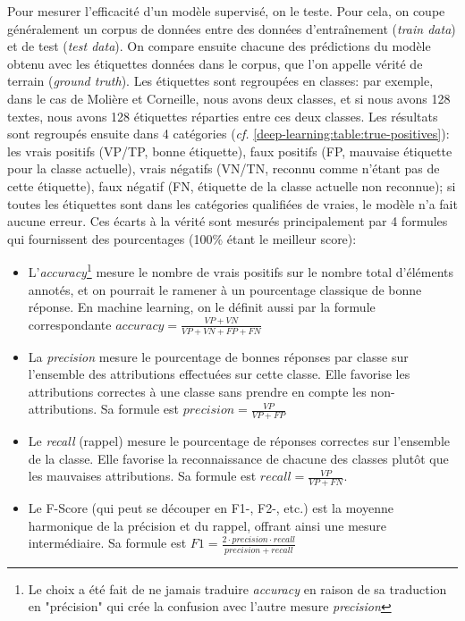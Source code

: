 Pour mesurer l'efficacité d'un modèle supervisé, on le teste. Pour cela, on coupe généralement un corpus de données entre des données d'entraînement (\textit{train data}) et de test (\textit{test data}). On compare ensuite chacune des prédictions du modèle obtenu avec les étiquettes données dans le corpus, que l'on appelle vérité de terrain (\textit{ground truth}). Les étiquettes sont regroupées en classes: par exemple, dans le cas de Molière et Corneille, nous avons deux classes, et si nous avons 128 textes, nous avons 128 étiquettes réparties entre ces deux classes. Les résultats sont regroupés ensuite dans 4 catégories (\textit{cf.} \ref{deep-learning:table:true-positives}): les vrais positifs (VP/TP, bonne étiquette), faux positifs (FP, mauvaise étiquette pour la classe actuelle), vrais négatifs (VN/TN, reconnu comme n'étant pas de cette étiquette), faux négatif (FN, étiquette de la classe actuelle non reconnue); si toutes les étiquettes sont dans les catégories qualifiées de vraies, le modèle n'a fait aucune erreur. Ces écarts à la vérité sont mesurés principalement par 4 formules qui fournissent des pourcentages (100\% étant le meilleur score):
\begin{itemize}
    \item L'\textit{accuracy}\footnote{Le choix a été fait de ne jamais traduire \textit{accuracy} en raison de sa traduction en "précision" qui crée la confusion avec l'autre mesure \textit{precision}} mesure le nombre de vrais positifs sur le nombre total d'éléments annotés, et on pourrait le ramener à un pourcentage classique de bonne réponse. En machine learning, on le définit aussi par la formule correspondante $accuracy = \frac{VP + VN}{VP + VN + FP + FN}$
    \item La \textit{precision} mesure le pourcentage de bonnes réponses par classe sur l'ensemble des attributions effectuées sur cette classe. Elle favorise les attributions correctes à une classe sans prendre en compte les non-attributions. Sa formule est $precision = \frac{VP}{VP + FP}$
    \item Le \textit{recall} (rappel) mesure le pourcentage de réponses correctes sur l'ensemble de la classe. Elle favorise la reconnaissance de chacune des classes plutôt que les mauvaises attributions. Sa formule est $recall = \frac{VP}{VP+FN}$.
    \item Le F-Score (qui peut se découper en F1-, F2-, etc.) est la moyenne harmonique de la précision et du rappel, offrant ainsi une mesure intermédiaire. Sa formule est $F1 = \frac{2 \cdot precision\cdot recall}{precision+ recall}$
\end{itemize}{}

